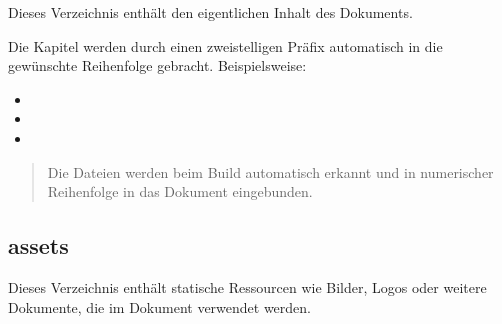 Dieses Verzeichnis enthält den eigentlichen Inhalt des Dokuments.

Die Kapitel werden durch einen zweistelligen Präfix automatisch in die gewünschte Reihenfolge gebracht. Beispielsweise:

\begin{itemize}
    \item {}
    \item {}
    \item {}
\end{itemize}

\begin{quote}
Die Dateien werden beim Build automatisch erkannt und in numerischer Reihenfolge in das Dokument eingebunden.
\end{quote}

\subsection*{assets}

Dieses Verzeichnis enthält statische Ressourcen wie Bilder, Logos oder weitere Dokumente, die im Dokument verwendet werden.
